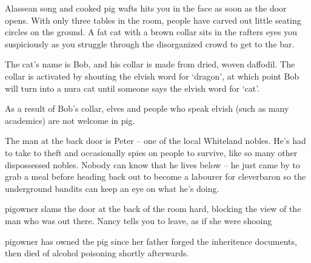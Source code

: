 \begin{multicols}{2}
\begin{table*}[t]
\label{mincing_pig_map}

\end{table*}

\columnbreak
{}

\begin{boxtext}
	Alassean song and cooked pig wafts hits you in the face as soon as the door opens.  With only three tables in the room, people have carved out little seating circles on the ground.  A fat cat with a brown collar sits in the rafters eyes you suspiciously as you struggle through the disorganized crowd to get to the bar.

\end{boxtext}

The cat's name is Bob, and his collar is made from dried, woven daffodil.  The collar is activated by shouting the elvish word for `dragon', at which point Bob will turn into a nura cat until someone says the elvish word for `cat'.

As a result of Bob's collar, elves and people who speak elvish (such as many academics) are not welcome in \gls{pig}.


\nuracat


The man at the back door is Peter -- one of the local Whiteland nobles. He's had to take to theft and occasionally spies on people to survive, like so many other dispossessed nobles.  Nobody can know that he lives below -- he just came by to grab a meal before heading back out to become a labourer for \gls{cleverbaron} so the underground bandits can keep an eye on what he's doing.

\begin{boxtext}

	\Gls{pigowner} slams the door at the back of the room hard, blocking the view of the man who was out there.  Nancy tells you to leave, as if she were shooing 

\end{boxtext}


\Gls{pigowner} has owned the pig since her father forged the inheritence documents, then died of alcohol poisoning shortly afterwards.



\end{multicols}
